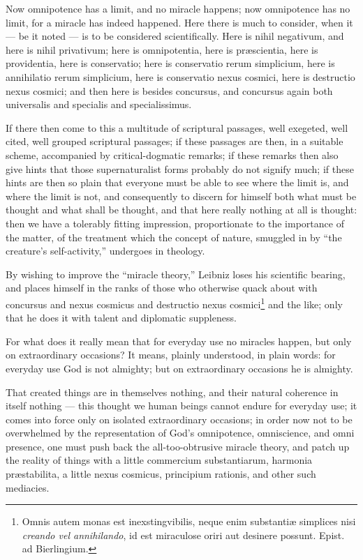 \documentclass[12pt,a4paper]{article}
\begin{document}
Now omnipotence has a limit, and no miracle happens; now omnipotence has no limit,
for a miracle has indeed happened. Here there is much to consider, when it --- be
it noted --- is to be considered scientifically. Here is nihil negativum, and here
is nihil privativum; here is omnipotentia, here is præscientia, here is providentia,
here is conservatio; here is conservatio rerum simplicium, here is annihilatio
rerum simplicium, here is conservatio nexus
cosmici, here is destructio nexus cosmici; and then here is besides concursus, and
concursus again both universalis and specialis and specialissimus.

If there then come to this a multitude of scriptural passages, well exegeted, well
cited, well grouped scriptural passages; if these passages are then, in a suitable
scheme, accompanied by critical-dogmatic remarks; if these remarks then also give
hints that those supernaturalist forms probably do not signify much; if these hints
are then so plain that everyone must be able to see where the limit is, and where
the limit is not, and consequently to discern for himself both what must be thought
and what shall be thought, and that here really nothing at all is thought: then we
have a tolerably fitting impression, proportionate to the importance of the matter,
of the treatment which the concept of nature, smuggled in by ``the creature's
self-activity,'' undergoes in theology.

By wishing to improve the ``miracle theory,'' Leibniz loses his scientific bearing,
and places himself in the ranks of those who otherwise quack about with concursus
and nexus cosmicus and destructio nexus cosmici\footnote{Omnis autem monas est
inexstingvibilis, neque enim substantiæ simplices nisi \emph{creando vel
annihilando}, id est miraculose oriri aut desinere possunt. Epist. ad Bierlingium.}
and the like; only that he does it with talent and diplomatic suppleness.

For what does it really mean that for everyday use no miracles happen, but only on
extraordinary occasions? It means, plainly understood, in plain words: for everyday
use God is not almighty; but on extraordinary occasions he is almighty.

That created things are in themselves nothing, and their natural coherence in
itself nothing --- this thought we human beings cannot endure for everyday use; it
comes into force only on isolated extraordinary occasions; in order now not to be
overwhelmed by the representation of God's omnipotence, omniscience, and
omni%
presence, one must push back the all-too-obtrusive miracle theory, and patch up the
reality of things with a little commercium substantiarum, harmonia præstabilita, a
little nexus cosmicus, principium rationis, and other such mediacies.
\end{document}
